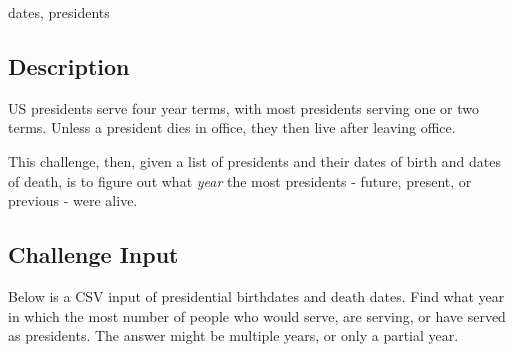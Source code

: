 dates, presidents

\subsection{Description}\label{description-32}

US presidents serve four year terms, with most presidents serving one or
two terms. Unless a president dies in office, they then live after
leaving office.

This challenge, then, given a list of presidents and their dates of
birth and dates of death, is to figure out what \emph{year} the most
presidents - future, present, or previous - were alive.

\subsection{Challenge Input}\label{challenge-input-26}

Below is a CSV input of presidential birthdates and death dates. Find
what year in which the most number of people who would serve, are
serving, or have served as presidents. The answer might be multiple
years, or only a partial year.

